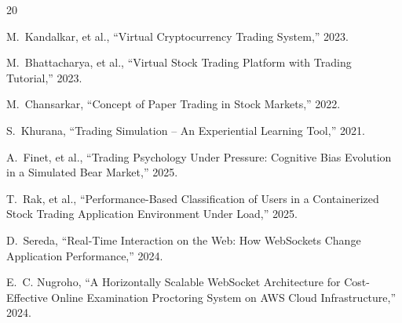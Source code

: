 \documentclass[conference]{IEEEtran}
\begin{document}
\balance

\begin{thebibliography}{20}
\small

M.~Kandalkar, et al., ``Virtual Cryptocurrency Trading System,'' 2023.

M.~Bhattacharya, et al., ``Virtual Stock Trading Platform with Trading Tutorial,'' 2023.

M.~Chansarkar, ``Concept of Paper Trading in Stock Markets,'' 2022.

S.~Khurana, ``Trading Simulation -- An Experiential Learning Tool,'' 2021.

A.~Finet, et al., ``Trading Psychology Under Pressure: Cognitive Bias Evolution in a Simulated Bear Market,'' 2025.

T.~Rak, et al., ``Performance-Based Classification of Users in a Containerized Stock Trading Application Environment Under Load,'' 2025.

D.~Sereda, ``Real-Time Interaction on the Web: How WebSockets Change Application Performance,'' 2024.

E.~C. Nugroho, ``A Horizontally Scalable WebSocket Architecture for Cost-Effective Online Examination Proctoring System on AWS Cloud Infrastructure,'' 2024.

\end{thebibliography}
\end{document}
